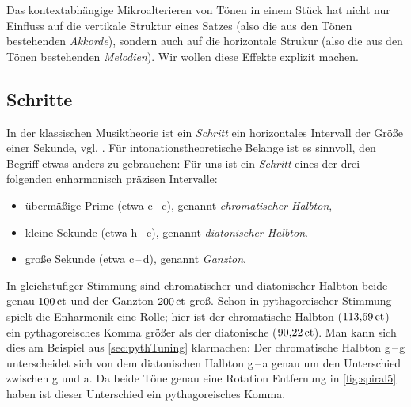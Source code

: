 Das kontextabhängige Mikroalterieren von Tönen in einem Stück hat nicht nur
Einfluss auf die vertikale Struktur eines Satzes (also die aus den Tönen
bestehenden \emph{Akkorde}), sondern auch auf die horizontale Strukur (also die
aus den Tönen bestehenden \emph{Melodien}). Wir wollen diese Effekte explizit
machen.

\subsection{Schritte}
\label{sec:steps}

In der klassischen Musiktheorie ist ein \emph{Schritt} ein horizontales
Intervall der Größe einer Sekunde, vgl. \cite[{}7.1]{Skript}.  Für
intonationstheoretische Belange ist es sinnvoll, den Begriff etwas anders zu
gebrauchen: Für uns ist ein \emph{Schritt} eines der drei folgenden enharmonisch
präzisen Intervalle:
\begin{itemize}[itemsep=0em]
\item übermäßige Prime (etwa c\,–\,\sharp c), genannt
  \emph{chromatischer Halbton},
\item kleine Sekunde (etwa h\,–\,c), genannt
  \emph{diatonischer Halbton}.
\item große Sekunde (etwa c\,–\,d), genannt
  \emph{Ganzton}.
\end{itemize}
In gleichstufiger Stimmung sind chromatischer und diatonischer Halbton beide
genau $100\,\text{ct}$ und der Ganzton $200\,\text{ct}$ groß.  Schon in pythagoreischer Stimmung
spielt die Enharmonik eine Rolle; hier ist der chromatische Halbton
($113{,}69\,\text{ct}$) ein pythagoreisches Komma größer als der diatonische
($90{,}22\,\text{ct}$). Man kann sich dies am Beispiel aus \cref{sec:pythTuning}
klarmachen: Der chromatische Halbton g\,–\,\sharp g unterscheidet sich von dem
diatonischen Halbton g\,–\,\flat a genau um den Unterschied zwischen \sharp g
und \flat a. Da beide Töne genau eine Rotation Entfernung in \cref{fig:spiral5}
haben ist dieser Unterschied ein pythagoreisches Komma.

